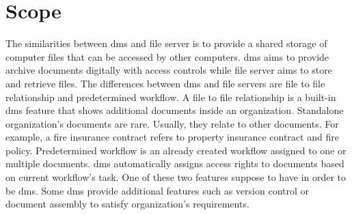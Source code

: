 \section{Scope}
\label{sec:scope}
The similarities between \gls{dms} and file server is to provide a shared storage of computer files that can be accessed by other computers.
\gls{dms} aims to provide archive documents digitally with access controls while file server aims to store and retrieve files.
The differences between \gls{dms} and file servers are file to file relationship and predetermined workflow.
A file to file relationship is a built-in \gls{dms} feature that shows additional documents inside an organization.
Standalone organization's documents are rare.
Usually, they relate to other documents.
For example, a fire insurance contract refers to property insurance contract and fire policy.
Predetermined workflow is an already created workflow assigned to one or multiple documents.
\gls{dms} automatically assigns access rights to documents based on current workflow's task.
One of these two features suppose to have in order to be \gls{dms}.
Some \gls{dms} provide additional features such as version control or document assembly to satisfy organization's requirements.

